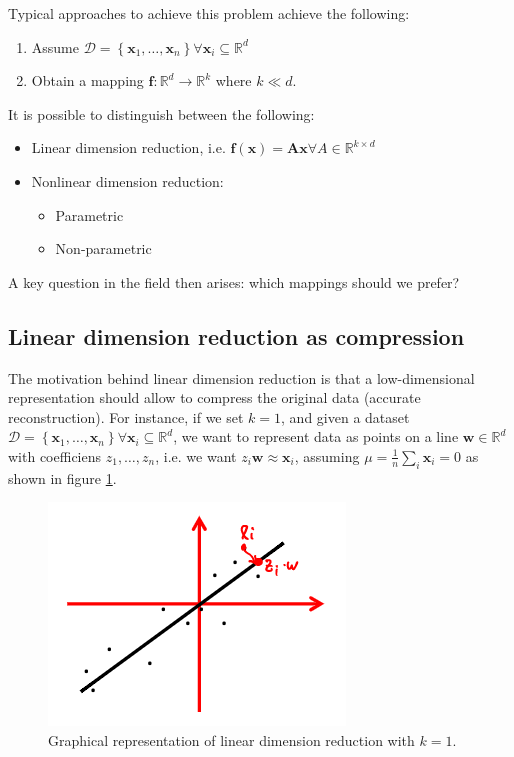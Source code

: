 \documentclass[a4paper,10pt,twoside]{article}
\begin{document}
Typical approaches to achieve this problem achieve the following:

\begin{enumerate}
    \item Assume $\mathcal{D}=\left\{\mathbf{x}_1,\ldots, \mathbf{x}_n\right\}\forall\mathbf{x}_i\subseteq\mathbb{R}^{d}$
    \item Obtain a mapping $\mathbf{f}:\mathbb{R}^{d}\rightarrow\mathbb{R}^{k}$ where $k\ll d$.
\end{enumerate}

It is possible to distinguish between the following:
\begin{itemize}
    \item Linear dimension reduction, i.e. $\mathbf{f(x)}=\mathbf{Ax}\forall A\in\mathbb{R}^{k\times d}$
    \item Nonlinear dimension reduction:
    \begin{itemize}
        \item Parametric
        \item Non-parametric
    \end{itemize}
\end{itemize}

A key question in the field then arises: which mappings should we prefer?

\subsection{Linear dimension reduction as compression}

The motivation behind linear dimension reduction is that a low-dimensional representation should allow to compress the original data (accurate reconstruction). For instance, if we set $k=1$, and given a dataset $\mathcal{D}=\left\{\mathbf{x}_1,\ldots, \mathbf{x}_n\right\}\forall\mathbf{x}_i\subseteq\mathbb{R}^{d}$, we want to represent data as points on a line $\mathbf{w}\in\mathbb{R}^d$ with coefficiens $z_1,\ldots, z_n$, i.e. we want $z_i\mathbf{w}\approx\mathbf{x}_i$, assuming $\mu=\frac{1}{n}\sum_{i}\mathbf{x}_i=0$ as shown in figure \ref{linear_dim_reduc}.

\begin{figure}
    \centering
    \includegraphics[width=.5\textwidth]{figures/linear-dim-reduc.png}
    \caption{Graphical representation of linear dimension reduction with $k=1$.}
    \label{linear_dim_reduc}
\end{figure}
\end{document}
